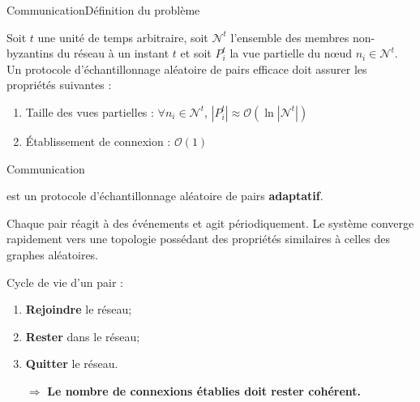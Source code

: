 \begin{frame}{Communication}{Définition du problème}

\begin{problem}
  \label{net:problem:properties}
  Soit $t$ une unité de temps arbitraire, soit $\mathcal{N}^t$ l'ensemble des
  membres non-byzantins du réseau à un instant $t$ et soit $P_i^t$ la vue
  partielle du nœud $n_i \in \mathcal{N}^t$. Un protocole d'échantillonnage
  aléatoire de pairs efficace doit assurer les propriétés suivantes :
  \begin{enumerate}
  \item Taille des vues partielles : \hfill $\forall n_i \in \mathcal{N}^t$,
    $|P_i^t| \approx \mathcal{O}(\ln |\mathcal{N}^t|)$
  \item Établissement de connexion : \hfill $\mathcal{O}(1)$
  \end{enumerate}
\end{problem}

\end{frame}



\begin{frame}{Communication}{\SPRAY}

  \SPRAY est un protocole d'échantillonnage aléatoire de pairs
  \textbf{adaptatif}. 

  \vspace{0.5cm}

  Chaque pair réagit à des événements et agit périodiquement. Le système
  converge rapidement vers une topologie possédant des propriétés similaires à
  celles des graphes aléatoires.

  \vspace{0.5cm}

  Cycle de vie d'un pair : 
  \begin{enumerate}
  \item \textbf{Rejoindre} le réseau;
  \item \textbf{Rester} dans le réseau;
  \item \textbf{Quitter} le réseau.
  \end{enumerate}

  \large
  \begin{itemize}
  \item [$\Rightarrow$] \textbf{Le nombre de connexions établies doit rester cohérent.}
  \end{itemize}
\end{frame}


